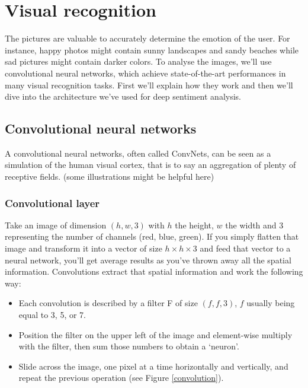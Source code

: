 \chapter{Visual recognition}
The pictures are valuable to accurately determine the emotion of the user. For instance, happy photos might contain sunny landscapes and sandy beaches while sad pictures might contain darker colors. To analyse the images, we'll use convolutional neural networks, which achieve state-of-the-art performances in many visual recognition tasks. First we'll explain how they work and then we'll dive into the architecture we've used for deep sentiment analysis.
\section{Convolutional neural networks}
A convolutional neural networks, often called ConvNets, can be seen as a simulation of the human visual cortex, that is to say an aggregation of plenty of receptive fields. (some illustrations might be helpful here)

\subsection{Convolutional layer}
Take an image of dimension $(h,w,3)$ with $h$ the height, $w$ the width and 3 representing the number of channels (red, blue, green). If you simply flatten that image and transform it into a vector of size $h\times h \times 3$ and feed that vector to a neural network, you'll get average results as you've thrown away all the spatial information. Convolutions extract that spatial information and work the following way:
\begin{itemize}
\item Each convolution is described by a filter F of size $(f, f, 3)$, $f$ usually being equal to 3, 5, or 7.
\item Position the filter on the upper left of the image and element-wise multiply with the filter, then sum those numbers to obtain a `neuron'.
\item Slide across the image, one pixel at a time horizontally and vertically, and repeat the previous operation (see Figure \ref{convolution}).
\end{itemize}

